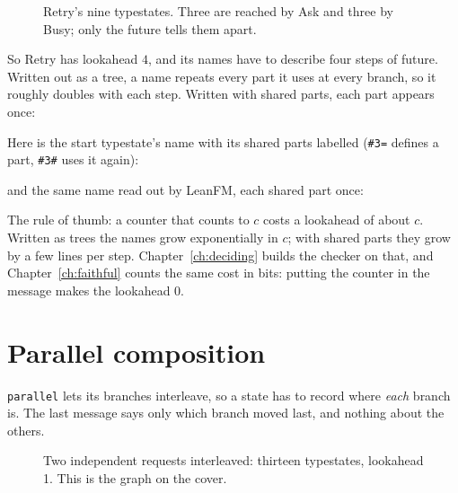 \begin{figure}[ht]
\centering
{}
\caption{Retry's nine typestates. Three are reached by Ask and three by Busy; only the future tells them apart.}
\label{fig:retry-ts}
\end{figure}

So Retry has lookahead $4$, and its names have to describe four steps of future. Written
out as a tree, a name repeats every part it uses at every branch, so it roughly doubles with
each step. Written with shared parts, each part appears once:


\noindent Here is the start typestate's name with its shared parts labelled
(\texttt{\#3=} defines a part, \texttt{\#3\#} uses it again):


\noindent and the same name read out by LeanFM, each shared part once:


The rule of thumb: a counter that counts to $c$ costs a lookahead of about $c$. Written as
trees the names grow exponentially in $c$; with shared parts they grow by a few lines per
step. Chapter~\ref{ch:deciding} builds the checker on that, and Chapter~\ref{ch:faithful}
counts the same cost in bits: putting the counter in the message makes the lookahead $0$.

\section{Parallel composition}

\texttt{parallel} lets its branches interleave, so a state has to record where
\emph{each} branch is. The last message says only which branch moved last, and nothing
about the others.

\begin{figure}[ht]
\centering
{}
\caption{Two independent requests interleaved: thirteen typestates, lookahead 1. This is the graph on the cover.}
\label{fig:parallel-ts}
\end{figure}


